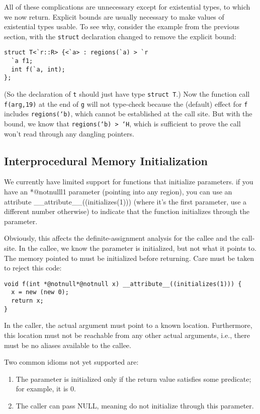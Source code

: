 All of these complications are unnecessary except for existential
types, to which we now return.  Explicit bounds are usually necessary
to make values of existential types usable.  To see why, consider the
example from the previous section, with the \texttt{struct}
declaration changed to remove the explicit bound:
\begin{verbatim}  
struct T<`r::R> {<`a> : regions(`a) > `r 
  `a f1; 
  int f(`a, int); 
};
\end{verbatim}
(So the declaration of \texttt{t} should just have type \texttt{struct
  T}.)  Now the function call \texttt{f(arg,19)} at the end of
\texttt{g} will not type-check because the (default) effect for
\texttt{f} includes \texttt{regions(`b)}, which cannot be established
at the call site.  But with the bound, we know that
  \texttt{regions(`b) > `H}, which is sufficient to prove the call
  won't read through any dangling pointers.

\subsection{Interprocedural Memory Initialization}

We currently have limited support for functions that initialize
parameters.  if you have an *@notnulll{1} parameter (pointing into any region),
you can use an attribute __attribute__((initializes(1))) (where it's
the first parameter, use a different number otherwise) to indicate
that the function initializes through the parameter.
        
Obviously, this affects the definite-assignment analysis for the
callee and the call-site.  In the callee, we know the parameter is
initialized, but not what it points to.  The memory pointed to must be
initialized before returning.  Care must be taken to reject this code:
\begin{verbatim}
void f(int *@notnull*@notnull x) __attribute__((initializes(1))) { 
  x = new (new 0); 
  return x; 
}
\end{verbatim}
In the caller, the actual argument must point to a known location.
Furthermore, this location must not be reachable from any other actual
arguments, i.e., there must be no aliases available to the callee.

Two common idioms not yet supported are: 
\begin{enumerate}
\item The parameter is
initialized only if the return value satisfies some predicate; for
example, it is 0.
\item The caller can pass NULL, meaning do not initialize through this
  parameter.
\end{enumerate}
